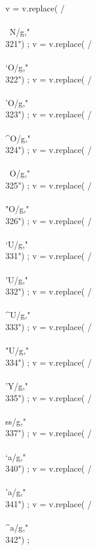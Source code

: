 {      v = v.replace(  /\\\\~N/g,"\\321") ;
      v = v.replace(  /\\\\`O/g,"\\322") ;
      v = v.replace(  /\\\\'O/g,"\\323") ;
      v = v.replace(  /\\\\^O/g,"\\324") ;
      v = v.replace(  /\\\\~O/g,"\\325") ;
      v = v.replace(  /\\\\"O/g,"\\326") ;
      v = v.replace(  /\\\\`U/g,"\\331") ;
      v = v.replace(  /\\\\'U/g,"\\332") ;
      v = v.replace(  /\\\\^U/g,"\\333") ;
      v = v.replace(  /\\\\"U/g,"\\334") ;
      v = v.replace(  /\\\\'Y/g,"\\335") ;
      v = v.replace(  /\\\\ss/g,"\\337") ;
      v = v.replace(  /\\\\`a/g,"\\340") ;
      v = v.replace(  /\\\\'a/g,"\\341") ;
      v = v.replace(  /\\\\^a/g,"\\342") ;
}
